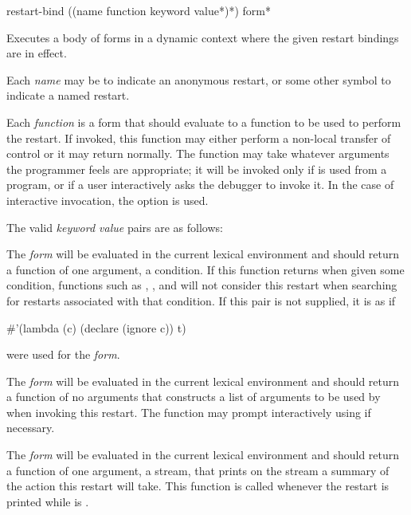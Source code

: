 \begin{defmac}
restart-bind ({(name function {keyword value}*)}*) {form}*

Executes a body of forms in a dynamic context where the given restart bindings
are in effect.

Each \emph{name} may be  to indicate an anonymous restart, or some
other symbol to indicate a named restart.

Each \emph{function} is a form that should evaluate to a function to be used to
perform the restart.  If invoked, this function may either perform a non-local
transfer of control or it may return normally. The function may take whatever
arguments the programmer feels are appropriate; it will be invoked only if
 is used from a program, or if a user interactively asks the
debugger to invoke it. In the case of interactive invocation, the
 option is used.

The valid \emph{keyword value} pairs are as follows:
\begin{flushdesc}
\item[\cd{:test-function \emph{form}}]

  The \emph{form} will be evaluated in the current lexical environment and
  should return a function of one argument, a condition.  If this function
  returns  when given some condition, functions such as
  , , and  will not
  consider this restart when searching for restarts associated with that
  condition.  If this pair is not supplied, it is as if
  \begin{lisp}
    \#'(lambda (c) (declare (ignore c)) t)
  \end{lisp}
  were used for the \emph{form}.
  
\item[\cd{:interactive-function \emph{form}}]

  The \emph{form} will be evaluated in the current lexical environment and
  should return a function of no arguments that constructs a list of arguments
  to be used by  when invoking this
  restart. The function may prompt interactively using  if
  necessary.

\item[\cd{:report-function \emph{form}}]

  The \emph{form} will be evaluated in the current lexical environment and
  should return a function of one argument, a stream, that prints on the stream
  a summary of the action this restart will take. This function is called
  whenever the restart is printed while  is .
\end{flushdesc}
\end{defmac}

